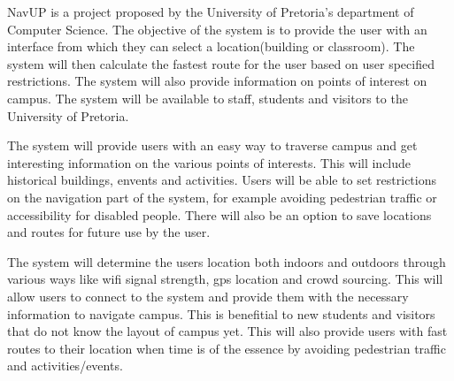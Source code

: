 NavUP is a project proposed by the University of Pretoria’s department of Computer Science. The objective of the system is to provide the user with an interface from which they can select a location(building or classroom). The system will then calculate the fastest route for the user based on user specified restrictions. The system will also provide information on points of interest on campus. The system will be available to staff, students and visitors to the University of Pretoria.

The system will provide users with an easy way to traverse campus and get interesting information on the various points of interests. This will include historical buildings, envents and activities. Users will be able to set restrictions on the navigation part of the system, for example avoiding pedestrian traffic or accessibility for disabled people. There will also be an option to save locations and routes for future use by the user.

The system will determine the users location both indoors and outdoors through various ways like wifi signal strength, gps location and crowd sourcing. This will allow users to connect to the system and provide them with the necessary information to navigate campus. This is benefitial to new students and visitors that do not know the layout of campus yet. This will also provide users with fast routes to their location when time is of the essence by avoiding pedestrian traffic and activities/events.
